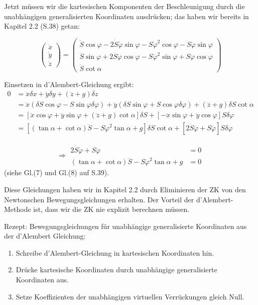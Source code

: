 \documentclass[10pt, letterpaper]{article}
\begin{document}
Jetzt müssen wir die kartesischen Komponenten der Beschleunigung durch die unabhängigen generalisierten Koordinaten ausdrücken; das haben wir bereits in Kapitel 2.2 (S.38) getan:

\[\begin{pmatrix} \ddot{x} \\ \ddot{y} \\ \ddot{z} \end{pmatrix} = \begin{pmatrix} \ddot{S}\cos\varphi - 2\dot{S}\dot{\varphi}\sin\varphi - S\dot{\varphi}^2\cos\varphi - S\ddot{\varphi}\sin\varphi \\ \ddot{S}\sin\varphi + 2\dot{S}\dot{\varphi}\cos\varphi - S\dot{\varphi}^2\sin\varphi + S\ddot{\varphi}\cos\varphi \\ \ddot{S}\cot\alpha \end{pmatrix}\]

Einsetzen in d'Alembert-Gleichung ergibt:
\[\begin{aligned}
0 &= \ddot{x}\delta x + \ddot{y}\delta y + (\ddot{z}+g)\delta z \\
&= \ddot{x}(\delta S\cos\varphi - S\sin\varphi\delta\varphi) + \ddot{y}(\delta S\sin\varphi + S\cos\varphi\delta\varphi) + (\ddot{z}+g)\delta S\cot\alpha \\
&= [\ddot{x}\cos\varphi + \ddot{y}\sin\varphi + (\ddot{z}+g)\cot\alpha]\delta S + [-\ddot{x}\sin\varphi + \ddot{y}\cos\varphi]S\delta\varphi \\
&= [(\tan\alpha + \cot\alpha)\ddot{S} - S\dot{\varphi}^2\tan\alpha + g]\delta S\cot\alpha + [2\dot{S}\dot{\varphi} + S\ddot{\varphi}]S\delta\varphi
\end{aligned}\]

\[\Rightarrow \boxed{
\begin{aligned}
2\dot{S}\dot{\varphi} + S\ddot{\varphi} &= 0 \\
(\tan\alpha + \cot\alpha)\ddot{S} - S\dot{\varphi}^2\tan\alpha + g &= 0
\end{aligned}
}\]
(siehe Gl.(7) und Gl.(8) auf S.39).

Diese Gleichungen haben wir in Kapitel 2.2 durch Eliminieren der ZK von den Newtonschen Bewegungsgleichungen erhalten. Der Vorteil der d'Alembert-Methode ist, dass wir die ZK nie explizit berechnen müssen.




Rezept: Bewegungsgleichungen für unabhängige generalisierte Koordinaten aus der d'Alembert Gleichung:

\begin{enumerate}
\item Schreibe d'Alembert-Gleichung in kartesischen Koordinaten hin.
\item Drücke kartesische Koordinaten durch unabhängige generalisierte Koordinaten aus.
\item Setze Koeffizienten der unabhängigen virtuellen Verrückungen gleich Null.
\end{enumerate}
\end{document}
